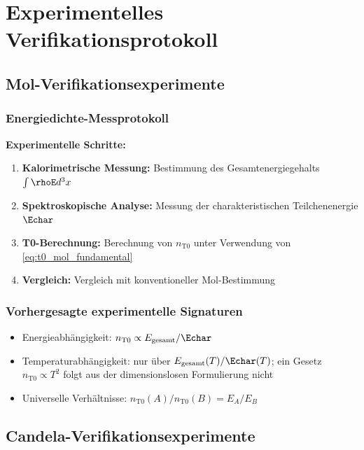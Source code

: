 	\section{Experimentelles Verifikationsprotokoll}
	\label{sec:experimentelles_verifikationsprotokoll}
	
	\subsection{Mol-Verifikationsexperimente}
	\label{subsec:mol_verifikation}
	
	\subsubsection{Energiedichte-Messprotokoll}
	\label{subsubsec:mol_energie_protokoll}
	
	\textbf{Experimentelle Schritte:}
	\begin{enumerate}
		\item \textbf{Kalorimetrische Messung:} Bestimmung des Gesamtenergiegehalts $\int \rhoE d^3x$
		\item \textbf{Spektroskopische Analyse:} Messung der charakteristischen Teilchenenergie $\Echar$
		\item \textbf{T0-Berechnung:} Berechnung von $n_{\text{T0}}$ unter Verwendung von \cref{eq:t0_mol_fundamental}
		\item \textbf{Vergleich:} Vergleich mit konventioneller Mol-Bestimmung
	\end{enumerate}
	
	\subsubsection{Vorhergesagte experimentelle Signaturen}
	\label{subsubsec:mol_experimentelle_signaturen}
	
	\begin{itemize}
		\item Energieabhängigkeit: $n_{\text{T0}} \propto E_{\text{gesamt}}/\Echar$
		\item Temperaturabhängigkeit: nur über $E_{\text{gesamt}}(T)/\Echar(T)$; ein Gesetz $n_{\text{T0}} \propto T^2$ folgt aus der dimensionslosen Formulierung nicht
		\item Universelle Verhältnisse: $n_{\text{T0}}(A)/n_{\text{T0}}(B) = E_A/E_B$
	\end{itemize}
	
	\subsection{Candela-Verifikationsexperimente}
	\label{subsec:candela_verifikation}
	
